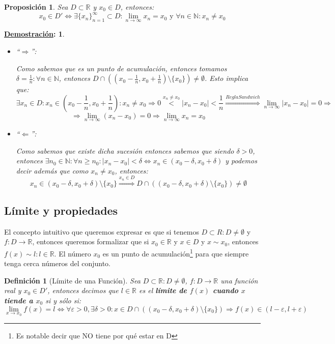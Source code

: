 \documentclass[10pt,a4paper,openright]{book}
\theoremstyle{break}
\newtheorem*{defi}{Definición}
\newtheorem*{prop}{Proposición}
\newtheorem*{demo}{\underline{Demostración}:}
\begin{document}
\begin{prop}
Sea $D\subset \mathbb R$ y $x_0\in D$, entonces:
$$x_0 \in D' \Leftrightarrow \exists \{x_n\}_{n=1}^\infty \subset D: \lim_{n\rightarrow \infty} x_n=x_0\mbox{ y } \forall n \in \mathbb{N} : x_n \neq x_0$$
\end{prop}
\begin{demo}
\begin{itemize}
\item ``$\Rightarrow $'':\par
Como sabemos que es un punto de acumulación, entonces tomamos $\delta=\frac{1}{n}: \forall n\in \mathbb N$, entonces $D\cap \left((x_0-\frac{1}{n}, x_0+\frac{1}{n})\mbox{\textbackslash} \{x_0\}\right)\neq \emptyset$. Esto implica que:
$$\exists x_n\in D: x_n\in \left(x_0-\frac{1}{n}, x_0+\frac{1}{n}\right): x_n\neq x_0\Rightarrow 0\stackrel{x_n\neq x_0}{<}|x_n-x_0|<\frac{1}{n} \stackrel{ReglaSandwich}{\Rightarrow} \lim_{n\rightarrow \infty} |x_n-x_0|=0\Rightarrow$$
$$\Rightarrow \lim_{n\rightarrow \infty} (x_n-x_0)=0\Rightarrow \lim_{n\rightarrow \infty} x_n=x_0$$

\item ``$\Leftarrow$'':\par
Como sabemos que existe dicha sucesión entonces sabemos que siendo $\delta >0$, entonces $\exists n_0\in \mathbb N: \forall n\geq n_0: |x_n-x_0|<\delta\Leftrightarrow x_n\in (x_0-\delta , x_0+\delta)$ y podemos decir además que como $x_n\neq x_0$, entonces:
$$x_n\in (x_0-\delta , x_0+\delta)\mbox{\textbackslash} \{x_0\}\stackrel{x_n\in D}{\Rightarrow} D\cap\left((x_0-\delta , x_0+\delta)\mbox{\textbackslash} \{x_0\}\right) \neq \emptyset$$
\end{itemize}
\end{demo}

\subsection{Límite y propiedades}
El concepto intuitivo que queremos expresar es que si tenemos $D\subset R: D\neq \emptyset$ y $f: D\longrightarrow \mathbb R$, entonces queremos formalizar que si $x_0\in \mathbb R$ y $x\in D$ y $x\sim x_0$, entonces $f(x)\sim l: l\in \mathbb R$. El número $x_0$ es un punto de acumulación\footnote{Es notable decir que NO tiene por qué estar en D} para que siempre tenga cerca números del conjunto.

\begin{defi}[Límite de una Función]
Sea $D\subset \mathbb R: D\neq \emptyset$, $f:D\longrightarrow \mathbb R$ una función real y $x_0\in D'$, entonces decimos que $l\in \mathbb R$ es el \textbf{límite de $f(x)$ cuando $x$ tiende a $x_0$} si y sólo si:
$$\lim_{x\rightarrow x_0} f(x) = l \Leftrightarrow \forall \varepsilon>0, \exists \delta>0 : x\in D\cap \left((x_0-\delta, x_0+\delta)\mbox{\textbackslash} \{x_0\}\right)\Rightarrow f(x)\in (l-\varepsilon, l+\varepsilon)$$
\end{defi}
\end{document}
